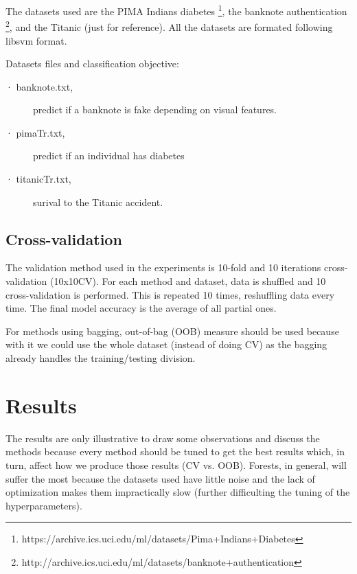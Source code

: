 \documentclass[a4paper,10pt]{article}
\begin{document}
The datasets used are the PIMA Indians diabetes \footnote{https://archive.ics.uci.edu/ml/datasets/Pima+Indians+Diabetes}, the banknote authentication  \footnote{http://archive.ics.uci.edu/ml/datasets/banknote+authentication}, and the Titanic (just for reference). All the datasets are formated following libsvm format.

Datasets files and classification objective:

\begin{description}
 \item [· banknote.txt,] predict if a banknote is fake depending on visual features.
 \item [· pimaTr.txt,] predict if an individual has diabetes
 \item [· titanicTr.txt,] surival to the Titanic accident.
\end{description}

\subsection{Cross-validation}
\label{subsec:validation}

The validation method used in the experiments is 10-fold and 10 iterations cross-validation (10x10CV). For each method and dataset, data is shuffled and 10 cross-validation is performed. This is repeated 10 times, reshuffling data every time. The final model accuracy is the average of all partial ones.

For methods using bagging, out-of-bag (OOB) measure should be used because with it we could use the whole dataset (instead of doing CV) as the bagging already handles the training/testing division. 

\section{Results}
\label{sec:results}
The results are only illustrative to draw some observations and discuss the methods because every method should be tuned to get the best results which, in turn, affect how we produce those results (CV vs. OOB). Forests, in general, will suffer the most because the datasets used have little noise and the lack of optimization makes them impractically slow (further difficulting the tuning of the hyperparameters).
\end{document}
